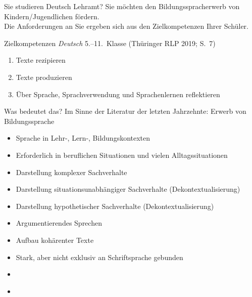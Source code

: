 \begin{frame}
  {Sie studieren Deutsch Lehramt?}
  \onslide<+->
  \onslide<+->
  Sie möchten den \alert{Bildungsspracherwerb} von Kindern\slash Jugendlichen fördern.\\
  Die Anforderungen an Sie ergeben sich aus den \alert{Zielkompetenzen Ihrer Schüler}.\\
  \onslide<+->
  \Zeile
  \begin{block}
    {Zielkompetenzen \textit{Deutsch} 5.--11.~Klasse (Thüringer RLP 2019; S.~7)}
    \begin{enumerate}[<+->]
      \item Texte rezipieren
      \item Texte produzieren
      \item \alert{Über Sprache, Sprachverwendung und Sprachenlernen reflektieren}
    \end{enumerate}
  \end{block}
\end{frame}

\begin{frame}
  {Was bedeutet das?}
  \onslide<+->
  \onslide<+->
  Im Sinne der Literatur der letzten Jahrzehnte: Erwerb von \alert{Bildungssprache}\\
  \Zeile
  \begin{itemize}[<+->]
    \item Sprache in \alert{Lehr-, Lern-, Bildungskontexten}
    \item Erforderlich in \alert{beruflichen Situationen} und \alert{vielen Alltagssituationen}
    \item Darstellung \alert{komplexer Sachverhalte}
    \item Darstellung \alert{situationsunabhängiger Sachverhalte} (Dekontextualisierung)
    \item Darstellung \alert{hypothetischer Sachverhalte} (Dekontextualisierung)
    \item \alert{Argumentierendes Sprechen}
    \item Aufbau \alert{kohärenter Texte}
    \item Stark, aber nicht exklusiv an \alert{Schriftsprache} gebunden
    \item {}\\
    \item {}\\
  \end{itemize}
\end{frame}

